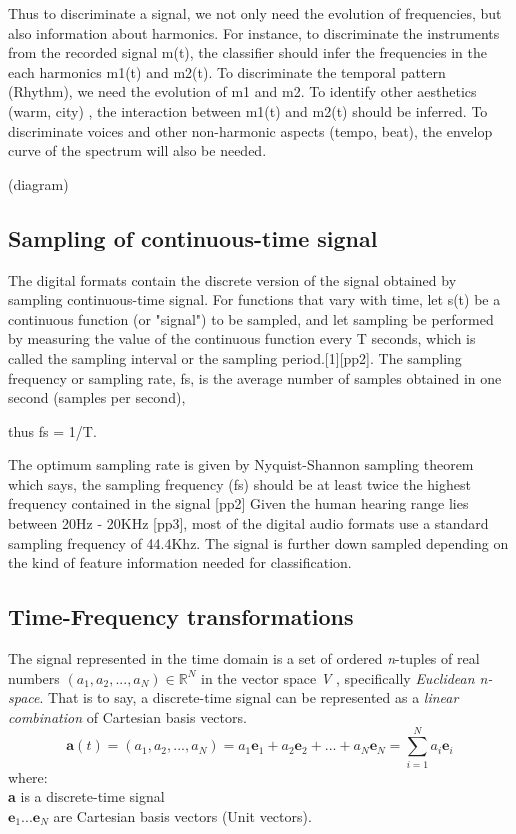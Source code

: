 Thus to discriminate a signal, we not only need the evolution of frequencies, but also information about harmonics. For instance, to discriminate the instruments from the recorded signal m(t), the classifier should infer the frequencies in the each harmonics m1(t) and m2(t). To discriminate the temporal pattern (Rhythm), we need the evolution of m1 and m2. To identify other aesthetics (warm, city) , the interaction between m1(t) and m2(t) should be inferred. To discriminate voices and other non-harmonic aspects (tempo, beat), the envelop curve of the spectrum will also be needed.    

(diagram)


\subsection{Sampling of continuous-time signal}
The digital formats contain the discrete version of the signal obtained by sampling continuous-time signal. For functions that vary with time, let s(t) be a continuous function (or "signal") to be sampled, and let sampling be performed by measuring the value of the continuous function every T seconds, which is called the sampling interval or the sampling period.[1][pp2]. The sampling frequency or sampling rate, fs, is the average number of samples obtained in one second (samples per second),  

thus fs = 1/T.

The optimum sampling rate is given by Nyquist-Shannon sampling theorem which says, the sampling frequency (fs) should be at least twice the highest frequency contained in the signal [pp2] Given the human hearing range lies between 20Hz - 20KHz [pp3], most of the digital audio formats use a standard sampling frequency of 44.4Khz. The signal is further down sampled depending on the kind of feature information needed for classification. 


\subsection{Time-Frequency transformations}
The signal represented in the time domain is a set of ordered \textit{n}-tuples of real numbers \( (a_{1},a_{2}, ...,a_{N}) \in \mathbb{R}^N \) in the vector space \textit{V} , specifically \textit{Euclidean n-space}. That is to say, a discrete-time signal can be represented as a \textit{linear combination} of Cartesian basis vectors. 
\begin{equation}
\textbf{a}(t) = (a_{1},a_{2}, ...,a_{N}) = a_{1}\textbf{e}_{1} + a_{2}\textbf{e}_{2} + ... + a_{N}\textbf{e}_{N} = \displaystyle\sum_{i=1}^{N}a_{i}\textbf{e}_{i}
\end{equation} 
where:\\
\indent \textbf{a} is a discrete-time signal\\
\indent $\textbf{e}_{1} ... \textbf{e}_{N}$ are Cartesian basis vectors (Unit vectors).
\bigskip

